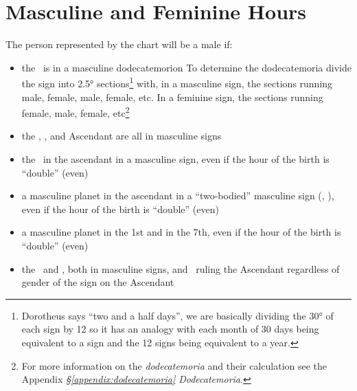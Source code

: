 \section{Masculine and Feminine Hours}

The person represented by the chart will be a male if:
\begin{itemize}[topsep=0em, itemsep=0em]
\item the  \Moon\, is in a masculine dodecatemorion
 \newline\newline
To determine the dodecatemoria divide the sign into 2.5° sections\footnote{Dorotheus says ``two and a half days'', we are basically dividing the 30° of each sign by 12 so it has an analogy with each month of 30 days being equivalent to a sign and the 12 signs being equivalent to a year.} with, in a masculine sign, the sections running male, female, male, female, etc. In a feminine sign, the sections running female, male, female, etc\footnote{For more information on the  \textsl{dodecatemoria}  and their calculation see the Appendix  \textsl{\S\ref{appendix:dodecatemoria} Dodecatemoria}.}

\item the \Sun, \Moon, and Ascendant are all in masculine signs

\item the \Sun\, in the ascendant in a masculine sign, even if the hour of the birth is ``double'' (even)

\item a masculine planet in the ascendant in a ``two-bodied'' masculine sign (\Gemini, \Sagittarius), even if the hour of the birth is ``double'' (even)

\item a masculine planet in the 1st and in the 7th,  even if the hour of the birth is ``double'' (even) 

\item the \Sun\, and \Moon, both in masculine signs, and \Jupiter\, ruling the Ascendant regardless of gender of the sign on the Ascendant

\end{itemize}